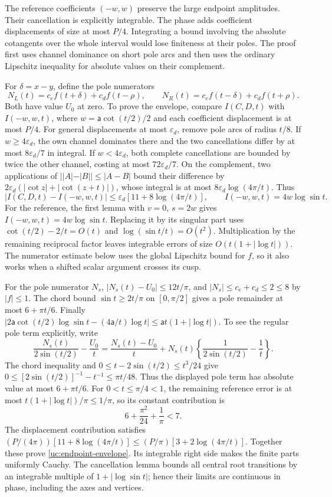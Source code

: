 The reference coefficients $(-w,w)$ preserve the large endpoint
amplitudes. Their cancellation is explicitly integrable. The phase
adds coefficient displacements of size at most $P/4$. Integrating a
bound involving the absolute cotangents over the whole interval would
lose finiteness at their poles. The proof first uses channel dominance
on short pole arcs and then uses the ordinary Lipschitz inequality for
absolute values on their complement.

For $\delta=x-y$, define the pole numerators
\[
 N_L(t)=c_ef(t+\delta)+c_df(t-\rho),\qquad
 N_R(t)=c_ef(t-\delta)+c_df(t+\rho).
\]
Both have value $U_0$ at zero. To prove the envelope, compare
$I(C,D,t)$ with $I(-w,w,t)$, where
$w=\mathsf{a}\cot(t/2)/2$ and each coefficient displacement is at most $P/4$.
For general displacements at most $\varepsilon_d$, remove pole arcs of
radius $t/8$. If $w\geq4\varepsilon_d$, the own channel dominates there
and the two cancellations differ by at most $8\varepsilon_d/7$ in
integral. If $w<4\varepsilon_d$, both complete cancellations are bounded
by twice the other channel, costing at most $72\varepsilon_d/7$.
On the complement, two applications of $||A|-|B||\leq|A-B|$
bound their difference by
$2\varepsilon_d(|\cot z|+|\cot(z+t)|)$, whose integral is at most
$8\varepsilon_d\log(4\pi/t)$. Thus
\[
 |I(C,D,t)-I(-w,w,t)|\leq\varepsilon_d[11+8\log(4\pi/t)],
 \qquad I(-w,w,t)=4w\log\sin t.
\]
For the reference, the first lemma with $v=0$, $s=2w$ gives
$I(-w,w,t)=4w\log\sin t$. Replacing it by its singular part uses
$\cot(t/2)-2/t=O(t)$ and $\log(\sin t/t)=O(t^2)$.
Multiplication by the remaining reciprocal factor leaves integrable
errors of size $O(t(1+|\log t|))$. The numerator estimate below uses
the global Lipschitz bound for $f$, so it also works when a shifted
scalar argument crosses its cusp.

For the pole numerator $N_s$, $|N_s(t)-U_0|\leq12t/\pi$,
and $|N_s|\leq c_e+c_d\leq2\leq8$ by $|f|\leq1$. The chord bound $\sin t\geq2t/\pi$ on $[0,\pi/2]$ gives a pole remainder at most
$6+\pi t/6$. Finally
$|2\mathsf{a}\cot(t/2)\log\sin t-(4\mathsf{a}/t)\log t|
\leq \mathsf{a}t(1+|\log t|)$. To see the regular pole term explicitly, write
\[
 \frac{N_s(t)}{2\sin(t/2)}-\frac{U_0}{t}
 =\frac{N_s(t)-U_0}{t}
  +N_s(t)\left\{\frac1{2\sin(t/2)}-\frac1t\right\}.
\]
The chord inequality and $0\leq t-2\sin(t/2)\leq t^3/24$ give
$0\leq[2\sin(t/2)]^{-1}-t^{-1}\leq\pi t/48$.
Thus the displayed pole term has absolute value at most $6+\pi t/6$.
For $0<t\leq\pi/4<1$, the remaining reference error is at most
$t(1+|\log t|)/\pi\leq1/\pi$, so its constant contribution is
\[
 6+\frac{\pi^2}{24}+\frac1\pi<7.
\]
The displacement contribution satisfies
$(P/(4\pi))[11+8\log(4\pi/t)]\leq(P/\pi)[3+2\log(4\pi/t)]$.
Together these prove \eqref{uc:endpoint-envelope}.
Its integrable right side makes the finite parts uniformly Cauchy.
The cancellation lemma bounds all central root transitions by an
integrable multiple of $1+|\log\sin t|$; hence their limits are
continuous in phase, including the axes and vertices.


